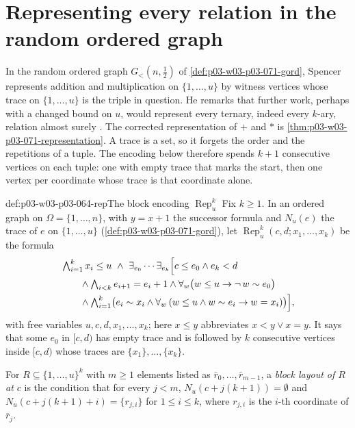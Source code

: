 \section{Representing every relation in the random ordered graph}
\label{sec:p03-w03-p03-064-k-ary}

In the random ordered graph \(G_<(n,\frac12)\) of
\cref{def:p03-w03-p03-071-gord}, Spencer represents addition and
multiplication on \(\{1,\ldots,u\}\) by witness vertices whose trace on
\(\{1,\ldots,u\}\) is the triple in question.  He remarks that further work,
perhaps with a changed bound on \(u\), would represent every ternary, indeed
every \(k\)-ary, relation almost surely
\cite[p.~23]{Spencer2007LogicRandomStructuresAuthor}.  The corrected
representation of \(+\) and \(\ast\) is
\cref{thm:p03-w03-p03-071-representation}.  A trace is a set, so it forgets
the order and the repetitions of a tuple.  The encoding below therefore
spends \(k+1\) consecutive vertices on each tuple: one with empty trace that
marks the start, then one vertex per coordinate whose trace is that
coordinate alone.

\begin{hbdefinition}{def:p03-w03-p03-064-rep}{The block encoding \(\operatorname{Rep}^k_u\)}
Fix \(k\geq1\).  In an ordered graph on \(\Omega=\{1,\ldots,n\}\), with
\(y=x+1\) the successor formula and \(N_u(e)\) the trace of \(e\) on
\(\{1,\ldots,u\}\) (\cref{def:p03-w03-p03-071-gord}), let
\(\operatorname{Rep}^k_u(c,d;x_1,\ldots,x_k)\) be the formula
\begin{align*}
  &\textstyle\bigwedge_{i=1}^k x_i\leq u\ \wedge\ \exists_{e_0}\cdots\exists_{e_k}\Bigl[
    c\leq e_0\wedge e_k<d\\
  &\qquad\textstyle\wedge\bigwedge_{i<k}e_{i+1}=e_i+1
    \wedge\forall_w\bigl(w\leq u\to\neg\,w\sim e_0\bigr)\\
  &\qquad\textstyle\wedge\bigwedge_{i=1}^k\bigl(e_i\sim x_i\wedge
    \forall_w\,(w\leq u\wedge w\sim e_i\to w=x_i)\bigr)\Bigr],
\end{align*}
with free variables \(u,c,d,x_1,\ldots,x_k\); here \(x\leq y\) abbreviates
\(x<y\vee x=y\).  It says that some \(e_0\) in \([c,d)\) has empty trace and
is followed by \(k\) consecutive vertices inside \([c,d)\) whose traces are
\(\{x_1\},\ldots,\{x_k\}\).

For \(R\subseteq\{1,\ldots,u\}^k\) with \(m\geq1\) elements listed as
\(\bar r_0,\ldots,\bar r_{m-1}\), a \emph{block layout of \(R\) at \(c\)} is
the condition that for every \(j<m\),
\(N_u(c+j(k+1))=\emptyset\) and \(N_u(c+j(k+1)+i)=\{r_{j,i}\}\) for
\(1\leq i\leq k\), where \(r_{j,i}\) is the \(i\)-th coordinate of
\(\bar r_j\).
\end{hbdefinition}

